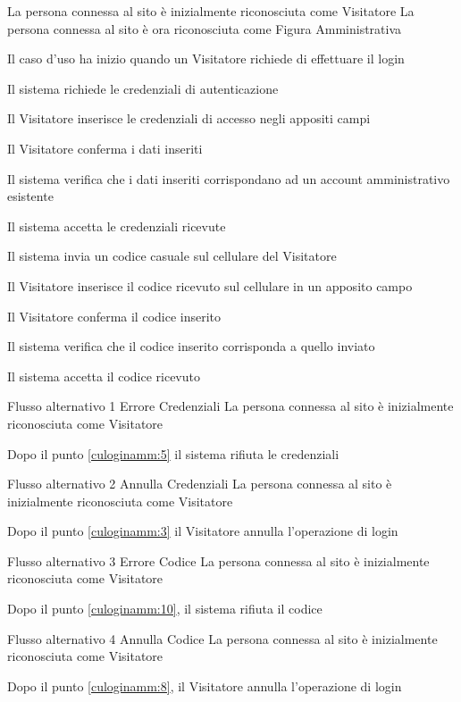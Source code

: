 \tabcuvspace

%
{}%
{La persona connessa al sito è inizialmente riconosciuta come Visitatore}%
{La persona connessa al sito è ora riconosciuta come Figura Amministrativa}%
{\begin{enumCU}
	\item Il caso d'uso ha inizio quando un Visitatore richiede di effettuare il login 
	\item Il sistema richiede le credenziali di autenticazione
	\item Il Visitatore inserisce le credenziali di accesso negli appositi campi \label{culoginamm:3}
	\item Il Visitatore conferma i dati inseriti
	\item Il sistema verifica che i dati inseriti corrispondano ad un account amministrativo esistente\label{culoginamm:5}
	\item Il sistema accetta le credenziali ricevute
	\item Il sistema invia un codice casuale sul cellulare del Visitatore
	\item Il Visitatore inserisce il codice ricevuto sul cellulare in un apposito campo \label{culoginamm:8}
	\item Il Visitatore conferma il codice inserito
	\item Il sistema verifica che il codice inserito corrisponda a quello inviato \label{culoginamm:10}
	\item Il sistema accetta il codice ricevuto
\end{enumCU}}%
%
{Flusso alternativo 1}%
{Errore Credenziali}%
{La persona connessa al sito è inizialmente riconosciuta come Visitatore}%
{\postNulle}%
{\begin{enumCU}
	\item Dopo il punto \ref{culoginamm:5} il sistema rifiuta le credenziali
\end{enumCU}}%
%
{Flusso alternativo 2}%
{Annulla Credenziali}%
{La persona connessa al sito è inizialmente riconosciuta come Visitatore}%
{\postNulle}%
{\begin{enumCU}
		\item Dopo il punto \ref{culoginamm:3} il Visitatore annulla l'operazione di login
\end{enumCU}}%
%
{Flusso alternativo 3}%
{Errore Codice}%
{La persona connessa al sito è inizialmente riconosciuta come Visitatore}%
{\postNulle}%
{\begin{enumCU}
		\item Dopo il punto \ref{culoginamm:10}, il sistema rifiuta il codice
\end{enumCU}}%
%
{Flusso alternativo 4}%
{Annulla Codice}%
{La persona connessa al sito è inizialmente riconosciuta come Visitatore}%
{\postNulle}%
{\begin{enumCU}
		\item Dopo il punto \ref{culoginamm:8}, il Visitatore annulla l'operazione di login
\end{enumCU}}%


